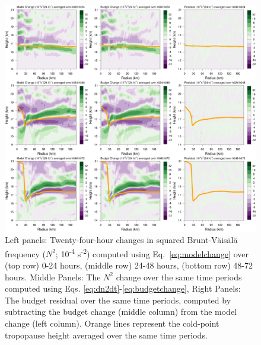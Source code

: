 \documentclass{ametsoc}
\begin{document}
\begin{figure}[ht]
\centerline{\includegraphics[width=39pc]{figures/mod+bud+res.png}}
\caption{Left panels: Twenty-four-hour changes in squared Brunt-V{\"a}is{\"a}l{\"a} frequency ($N^2$; 10\textsuperscript{-4} s\textsuperscript{-2}) computed using Eq.~\ref{eq:modelchange} over (top row) 0-24 hours, (middle row) 24-48 hours, (bottom row) 48-72 hours.
Middle Panels: The $N^2$ change over the same time periods computed using Eqs. \ref{eq:dn2dt}-\ref{eq:budgetchange}, %
Right Panels: The budget residual over the same time periods, computed by subtracting the budget change (middle column) from the model change (left column).
Orange lines represent the cold-point tropopause height averaged over the same time periods.}
\label{fig:mod+bud+res}
\end{figure}
\end{document}
